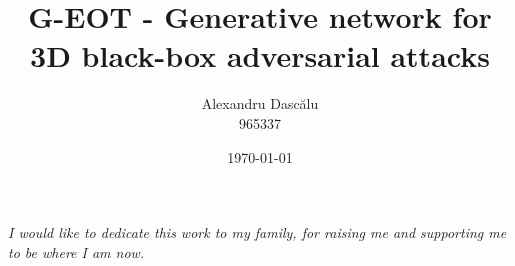 \documentclass[11pt, a4paper, oneside]{custard}
\begin{document}
	
	\title{G-EOT - Generative network for 3D black-box adversarial attacks}
	\author{Alexandru Dascălu\protect\\{\normalsize 965337}}
	
	
	
	\date{\today}
	
	\frontmatter%
	\maketitle
	\declaration
	\cleardoublepage
	
	\begin{vplace}[0.7]
		\begin{large}
			\begin{center}
				\textit{I would like to dedicate this work to my family, for raising me and supporting me to be where I am now.}
			\end{center}
		\end{large}
	\end{vplace}
\end{document}
